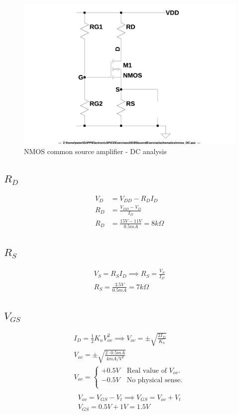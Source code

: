 \documentclass[10pt,a4paper]{book}
\begin{document}
\begin{figure}[h]
  \centering
  \includegraphics[width=12cm]{schematics/nmos_DC.jpg}
  \caption{NMOS common source amplifier - DC analysis}
  \label{nmos_DC}
\end{figure}

\subsection{$R_D$}
\begin{align}
V_{D} &= V_{DD} - R_D I_D\\
R_D &= \frac{V_{DD} - V_D}{I_D}\\
R_D &= \frac{15V - 11V}{0.5mA} = 8k\Omega
\end{align}

\subsection{$R_S$}
\begin{align}
V_S = R_S I_D \implies 
R_S = \frac{V_S}{I_D}\\
R_S = \frac{3.5V}{0.5mA} = 7k\Omega
\end{align}

\subsection{$V_{GS}$}
\begin{align}
I_D = \frac{1}{2}K_nV_{ov}^2 \implies
V_{ov} = \pm \sqrt{\frac{2 I_D}{K_n}}\\
V_{ov} = \pm \sqrt{\frac{2 \cdot 0.5mA}{4 mA/V^2}}\\
V_{ov} =
\left\{\begin{array}{l}
  + 0.5V \quad \text{Real value of } V_{ov} \text{.}\\
  - 0.5V \quad \text{No physical sense.}\\
\end{array}\right.\\
\end{align}
\begin{align}
V_{ov} = V_{GS} - V_{t} \implies
V_{GS} = V_{ov} + V_{t}\\
V_{GS} = 0.5V + 1V = 1.5V\\
\end{align}
\end{document}
